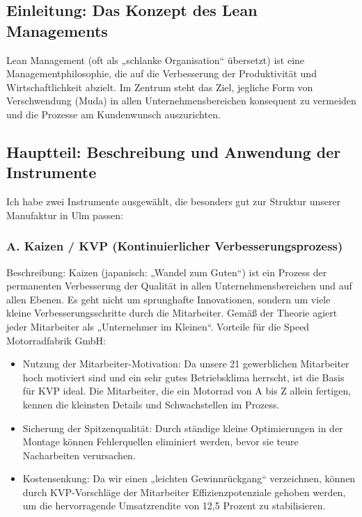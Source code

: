 \documentclass[12pt, a4paper]{article}
\begin{document}
\subsection{Einleitung: Das Konzept des Lean Managements}
Lean Management (oft als „schlanke Organisation“ übersetzt) ist eine Managementphilosophie, die auf die Verbesserung der 
Produktivität und Wirtschaftlichkeit abzielt. Im Zentrum steht das Ziel, jegliche Form von Verschwendung (Muda) 
in allen Unternehmensbereichen konsequent zu vermeiden und die Prozesse am Kundenwunsch auszurichten.

\subsection{Hauptteil: Beschreibung und Anwendung der Instrumente}
Ich habe zwei Instrumente ausgewählt, die besonders gut zur Struktur unserer Manufaktur in Ulm passen:
\subsubsection{A. Kaizen / KVP (Kontinuierlicher Verbesserungsprozess)}
Beschreibung: Kaizen (japanisch: „Wandel zum Guten“) ist ein Prozess der permanenten Verbesserung der 
Qualität in allen Unternehmensbereichen und auf allen Ebenen. Es geht nicht um sprunghafte Innovationen, 
sondern um viele kleine Verbesserungsschritte durch die Mitarbeiter. Gemäß der Theorie agiert jeder Mitarbeiter als „Unternehmer im Kleinen“.
Vorteile für die Speed Motorradfabrik GmbH:
\begin{itemize}
    \item Nutzung der Mitarbeiter-Motivation: Da unsere 21 gewerblichen Mitarbeiter hoch motiviert sind und ein sehr gutes Betriebsklima herrscht, ist die Basis für KVP ideal. Die Mitarbeiter, die ein Motorrad von A bis Z allein fertigen, kennen die kleinsten Details und Schwachstellen im Prozess.
    \item Sicherung der Spitzenqualität: Durch ständige kleine Optimierungen in der Montage können Fehlerquellen eliminiert werden, bevor sie teure Nacharbeiten verursachen.
    \item Kostensenkung: Da wir einen „leichten Gewinnrückgang“ verzeichnen, können durch KVP-Vorschläge der Mitarbeiter Effizienzpotenziale gehoben werden, um die hervorragende Umsatzrendite von 12,5 Prozent zu stabilisieren.
\end{itemize}
\end{document}
